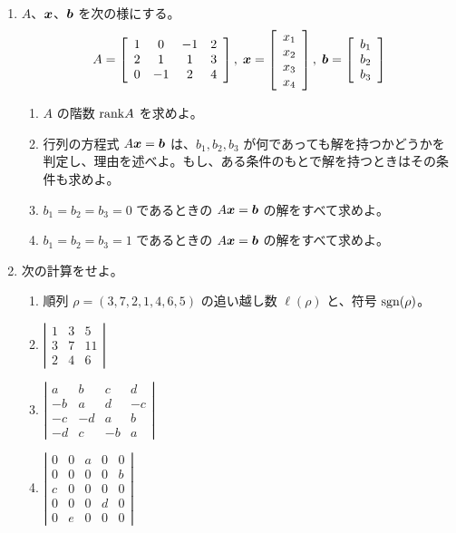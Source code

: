 \documentclass[11pt]{jarticle}
\newcommand{\bb}{\mbox{\boldmath $b$}}
\newcommand{\bx}{\mbox{\boldmath $x$}}
\newcommand{\sgn}{\mbox{{\rm sgn}}}
\newcommand{\rank}{\mbox{{\rm rank}}}
\begin{document}
\begin{enumerate}
\item $A$、$\bx$、$\bb$ を次の様にする。%
$$A = \left[\begin{array}{cccc}
1 & 0 & -1 & 2\\
2 & 1 & 1 & 3\\
0 & -1 & 2 & 4
\end{array}\right],\;\bx = \left[\begin{array}{c} x_1 \\ x_2 \\ x_3 \\ x_4 \end{array}\right],\;\bb = \left[\begin{array}{c} b_1 \\ b_2 \\ b_3 \end{array}\right]$$
\begin{enumerate}
\item $A$ の階数 $\rank A$ を求めよ。
\item 行列の方程式 $A\bx = \bb$ は、$b_1, b_2, b_3$ が何であっても解を持つかどうかを判定し、理由を述べよ。もし、ある条件のもとで解を持つときはその条件も求めよ。
\item $b_1 = b_2 = b_3 = 0$ であるときの $A\bx = \bb$ の解をすべて求めよ。
\item $b_1 = b_2 = b_3 = 1$ であるときの $A\bx = \bb$ の解をすべて求めよ。
\end{enumerate}

\item 次の計算をせよ。%
	\begin{enumerate}
	\item 順列 $\rho = (3, 7, 2, 1, 4, 6, 5)$ の追い越し数 $\ell(\rho)$ と、符号 $\sgn(\rho)$。
	\item ${\displaystyle
	\left|\begin{array}{ccc} 1 & 3 & 5 \\ 3 & 7 & 11 \\ 2 & 4 & 6
	\end{array}\right|}$ %
	\item ${\displaystyle
	\left|\begin{array}{cccc} a & b & c & d \\ -b & a & d & -c \\ -c & -d & a & b\\
	-d & c & -b & a \end{array}\right|}$ %
	\item ${\displaystyle
	\left|\begin{array}{ccccc} 0 & 0 & a & 0 & 0 \\ 0 & 0 & 0 & 0 & b \\ c & 0& 0 & 0 & 0\\
	0 & 0 & 0 & d & 0 \\ 0 & e & 0 & 0 & 0 \end{array}\right|}$ %
	\end{enumerate}
	

\end{enumerate}
\end{document}
